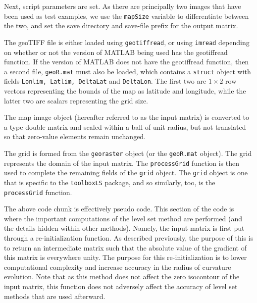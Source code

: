 \documentclass{article}
\begin{document}
Next, script parameters are set. As there are principally two
images that have been used as test examples, we use the
\texttt{mapSize} variable to differentiate between the two, and
set the save directory and save-file prefix for the output
matrix. 



The geoTIFF file is either loaded using \texttt{geotiffread}, or
using \texttt{imread} depending on whether or not the version of
MATLAB being used has the geotiffread function. If the version of
MATLAB does not have the geotiffread function, then a second file,
\texttt{geoR.mat} must also be loaded, which contains a
\texttt{struct} object with fields \texttt{Lonlim, Latlim,
  DeltaLat} and \texttt{DeltaLon}. The first two are $1\times 2$
row vectors representing the bounds of the map as latitude and
longitude, while the latter two are scalars representing the grid
size.

The map image object (hereafter referred to as the input matrix)
is converted to a type double matrix and scaled within a ball of
unit radius, but not translated so that zero-value elements remain
unchanged.

The grid is formed from the \texttt{georaster} object (or the
\texttt{geoR.mat} object). The grid represents the domain of the
input matrix. The \texttt{processGrid} function is then used to
complete the remaining fields of the \texttt{grid} object. The
\texttt{grid} object is one that is specific to the
\texttt{toolboxLS} package, and so similarly, too, is the
\texttt{processGrid} function.



The above code chunk is effectively pseudo code. This section of
the code is where the important computations of the level set
method are performed (and the details hidden within other
methods). Namely, the input matrix is first put through a
re-initialization function. As described previously, the purpose of
this is to return an intermediate matrix such that the absolute
value of the gradient of this matrix is everywhere unity. The
purpose for this re-initialization is to lower computational
complexity and increase accuracy in the radius of curvature
evolution. Note that as this method does not affect the zero
isocontour of the input matrix, this function does not adversely
affect the accuracy of level set methods that are used afterward.
\end{document}

